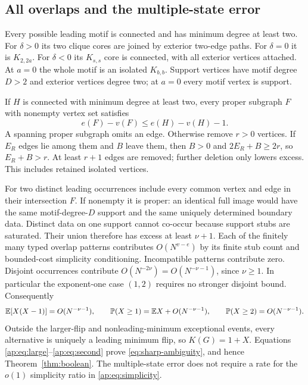 \subsection{All overlaps and the multiple-state error}
Every possible leading motif is connected and has minimum degree
at least two. For $\delta>0$ its two clique cores are joined by
exterior two-edge paths. For $\delta=0$ it is $K_{2,2a}$. For
$\delta<0$ its $K_{s,s}$ core is connected, with all exterior vertices
attached. At $a=0$ the whole motif is an isolated $K_{b,b}$.
Support vertices have motif degree $D>2$ and exterior vertices degree
two; at $a=0$ every motif vertex is support.

If $H$ is connected with minimum degree at least two, every proper
subgraph $F$ with nonempty vertex set satisfies
\[
 e(F)-v(F)\le e(H)-v(H)-1.
\]
A spanning proper subgraph omits an edge. Otherwise remove $r>0$
vertices. If $E_R$ edges lie among them and $B$ leave them, then
$B>0$ and $2E_R+B\ge2r$, so $E_R+B>r$. At least $r+1$ edges
are removed; further deletion only lowers excess. This includes
retained isolated vertices.

For two distinct leading occurrences include every common vertex
and edge in their intersection $F$. If nonempty it is proper: an
identical full image would have the same motif-degree-$D$ support
and the same uniquely determined boundary data. Distinct data on one
support cannot co-occur because support stubs are saturated. Their
union therefore has excess at least $\nu+1$. Each of the finitely
many typed overlap patterns contributes $O(N^{v-e})$ by its finite
stub count and bounded-cost simplicity conditioning. Incompatible
patterns contribute zero. Disjoint occurrences contribute
$O(N^{-2\nu})=O(N^{-\nu-1})$, since $\nu\ge1$. In particular the
exponent-one case $(1,2)$ requires no stronger disjoint bound.
Consequently
\begin{equation}\label{ap:eq:second}
 \mathbb E[X(X-1)]=O(N^{-\nu-1}),\qquad
 \mathbb P(X\ge1)=\mathbb E X+O(N^{-\nu-1}),\qquad
 \mathbb P(X\ge2)=O(N^{-\nu-1}).
\end{equation}
Outside the larger-flip and nonleading-minimum exceptional events,
every alternative is uniquely a leading minimum flip, so $K(G)=1+X$.
Equations \eqref{ap:eq:large}--\eqref{ap:eq:second} prove
\eqref{eq:sharp-ambiguity}, and hence Theorem~\ref{thm:boolean}.
The multiple-state error does not require a rate for the $o(1)$
simplicity ratio in \eqref{ap:eq:simplicity}.

